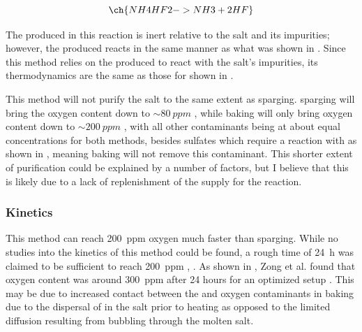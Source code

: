 \begin{equation}
  \ch{NH4HF2 -> NH3 + 2 HF} \label{eq: nh4hf2 decomposition}
\end{equation}

The  produced in this reaction is inert relative to the salt and its
impurities; however, the  produced reacts in the same manner as what
was shown in . Since this method
relies on the produced  to react with the salt’s impurities, its
thermodynamics are the same as those for  shown in
.
\par

This method will not purify the salt to the same extent as  sparging.
 sparging will bring the oxygen content down to $\sim\SI{80}{ppm}$
\cite{rev16,rev30},
while  baking will only bring oxygen content down to
$\sim\SI{200}{ppm}$ \cite{rev43},
with all other contaminants being at about equal concentrations for both
methods, besides sulfates which require a reaction with  as shown in
, meaning  baking will not remove this contaminant.
This shorter extent of purification could be explained by a number of
factors, but I believe that this is likely due to a lack of replenishment
of the  supply for the reaction. \par

\subsubsection{Kinetics}
\label{sec: nf4hf2 kinetics}

This method can reach \SI{200}{ppm} oxygen much faster than 
sparging. While no studies into the kinetics of this method could be found,
a rough time of \SI{24}{\hour} was claimed to be sufficient to reach
\SI{200}{ppm} \cite{rev42}, \cite{rev43}. As shown in
, Zong et al. found that oxygen content was
around \SI{300}{ppm} after 24 hours for an optimized setup \cite{rev30}.
This may be due to increased contact between the  and oxygen
contaminants in  baking due to the
dispersal of  in the salt prior to heating as opposed to the
limited diffusion resulting from  bubbling through the molten salt.
\par

